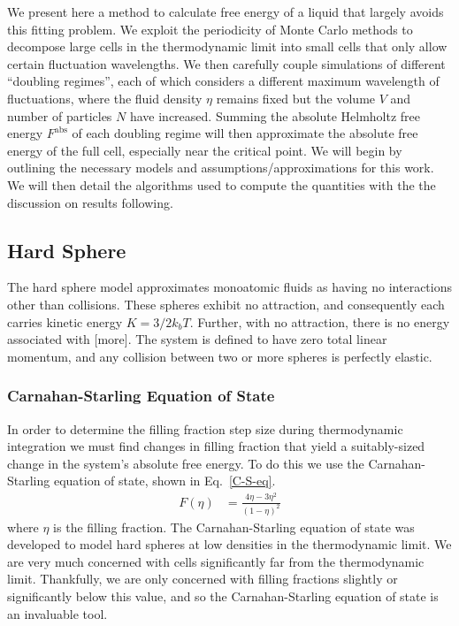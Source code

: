 \documentclass[12pt]{article}
\begin{document}
We present here a method to calculate free energy of a liquid that largely avoids this fitting problem. We exploit the periodicity of Monte Carlo methods to decompose large cells in the thermodynamic limit into small cells that only allow certain fluctuation wavelengths. We then carefully couple simulations of different ``doubling regimes'', each of which considers a different maximum wavelength of fluctuations, where the fluid density $\eta$ remains fixed but the volume $V$ and number of particles $N$ have increased. Summing the absolute Helmholtz free energy $F^{\text{abs}}$ of each doubling regime will then approximate the absolute free energy of the full cell, especially near the critical point. We will begin by outlining the necessary models and assumptions/approximations for this work. We will then detail the algorithms used to compute the quantities with the the discussion on results following. 

\subsection{Hard Sphere}
The hard sphere model approximates monoatomic fluids as having no interactions other than collisions. These spheres exhibit no attraction, and consequently each carries kinetic energy $K = 3/2 k_b T$. Further, with no attraction, there is no energy associated with [more]. The system is defined to have zero total linear momentum, and any collision between two or more spheres is perfectly elastic. 

\subsubsection{Carnahan-Starling Equation of State}
In order to determine the filling fraction step size during thermodynamic integration we must find changes in filling fraction that yield a suitably-sized change in the system's absolute free energy. To do this we use the Carnahan-Starling equation of state, shown in Eq.~\ref{C-S-eq}.
\begin{align}
    F(\eta) &= \frac{4\eta - 3\eta^2}{(1-\eta)^2}   
    \label{C-S-eq}  
\end{align} 
where $\eta$ is the filling fraction. The Carnahan-Starling equation of state was developed to model hard spheres at low densities in the thermodynamic limit. We are very much concerned with cells significantly far from the thermodynamic limit. Thankfully, we are only concerned with filling fractions slightly or significantly below this value, and so the Carnahan-Starling equation of state is an invaluable tool.\\ 
\end{document}
